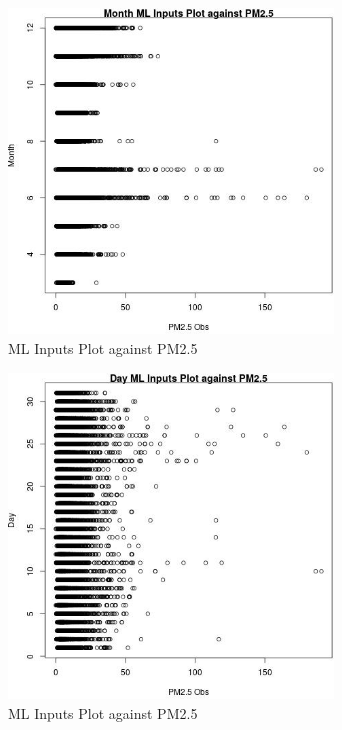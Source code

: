 \begin{figure} 
\centering  
\includegraphics[width=0.77\textwidth]{Code_Outputs/Report_ML_input_PM25_Step4_part_e_de_duplicated_aves_MonthvPM25_Obs.jpg} 
\caption{\label{fig:Report_ML_input_PM25_Step4_part_e_de_duplicated_avesMonthvPM25_Obs}ML Inputs Plot against PM2.5} 
\end{figure} 
 

\begin{figure} 
\centering  
\includegraphics[width=0.77\textwidth]{Code_Outputs/Report_ML_input_PM25_Step4_part_e_de_duplicated_aves_DayvPM25_Obs.jpg} 
\caption{\label{fig:Report_ML_input_PM25_Step4_part_e_de_duplicated_avesDayvPM25_Obs}ML Inputs Plot against PM2.5} 
\end{figure} 
 

